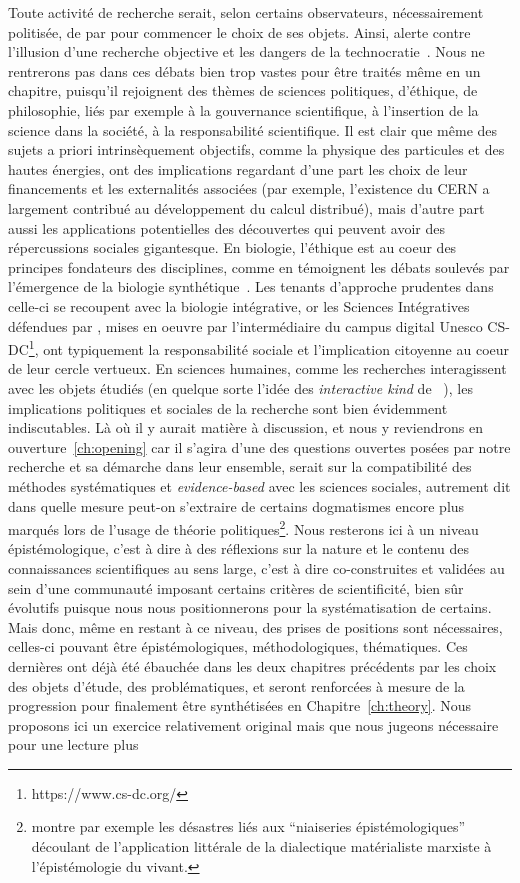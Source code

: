 Toute activité de recherche serait, selon certains observateurs, nécessairement politisée, de par pour commencer le choix de ses objets. Ainsi,  alerte contre l'illusion d'une recherche objective et les dangers de la technocratie~\cite{ripoll2017jig}. Nous ne rentrerons pas dans ces débats bien trop vastes pour être traités même en un chapitre, puisqu'il rejoignent des thèmes de sciences politiques, d'éthique, de philosophie, liés par exemple à la gouvernance scientifique, à l'insertion de la science dans la société, à la responsabilité scientifique. Il est clair que même des sujets a priori intrinsèquement objectifs, comme la physique des particules et des hautes énergies, ont des implications regardant d'une part les choix de leur financements et les externalités associées (par exemple, l'existence du CERN a largement contribué au développement du calcul distribué), mais d'autre part aussi les applications potentielles des découvertes qui peuvent avoir des répercussions sociales gigantesque. En biologie, l'éthique est au coeur des principes fondateurs des disciplines, comme en témoignent les débats soulevés par l'émergence de la biologie synthétique~\cite{gutmann2011ethics}. Les tenants d'approche prudentes dans celle-ci se recoupent avec la biologie intégrative, or les Sciences Intégratives défendues par , mises en oeuvre par l'intermédiaire du campus digital Unesco CS-DC\footnote{https://www.cs-dc.org/}, ont typiquement la responsabilité sociale et l'implication citoyenne au coeur de leur cercle vertueux. En sciences humaines, comme les recherches interagissent avec les objets étudiés (en quelque sorte l'idée des \emph{interactive kind} de ~\cite{hacking1999social}), les implications politiques et sociales de la recherche sont bien évidemment indiscutables. Là où il y aurait matière à discussion, et nous y reviendrons en ouverture~\ref{ch:opening} car il s'agira d'une des questions ouvertes posées par notre recherche et sa démarche dans leur ensemble, serait sur la compatibilité des méthodes systématiques et \emph{evidence-based} avec les sciences sociales, autrement dit dans quelle mesure peut-on s'extraire de certains dogmatismes encore plus marqués lors de l'usage de théorie politiques\footnote{ montre par exemple les désastres liés aux ``niaiseries épistémologiques'' découlant de l'application littérale de la dialectique matérialiste marxiste à l'épistémologie du vivant.}. Nous resterons ici à un niveau épistémologique, c'est à dire à des réflexions sur la nature et le contenu des connaissances scientifiques au sens large, c'est à dire co-construites et validées au sein d'une communauté imposant certains critères de scientificité, bien sûr évolutifs puisque nous nous positionnerons pour la systématisation de certains. Mais donc, même en restant à ce niveau, des prises de positions sont nécessaires, celles-ci pouvant être épistémologiques, méthodologiques, thématiques. Ces dernières ont déjà été ébauchée dans les deux chapitres précédents par les choix des objets d'étude, des problématiques, et seront renforcées à mesure de la progression pour finalement être synthétisées en Chapitre~\ref{ch:theory}. Nous proposons ici un exercice relativement original mais que nous jugeons nécessaire pour une lecture plus 